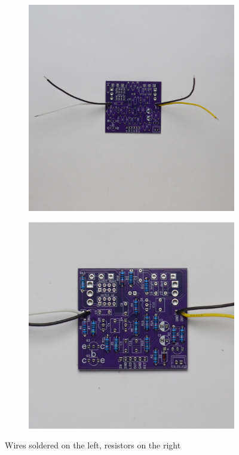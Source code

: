 \documentclass[a4paper,12pt]{article}
\begin{document}

\begin{figure}[h!]
  \centering
  \begin{subfigure}[b]{0.49\textwidth}
    \centering
    \includegraphics[width=\textwidth]{build/10-board-wires-1000px.jpg}
  \end{subfigure}
  \begin{subfigure}[b]{0.49\textwidth}
    \centering
    \includegraphics[width=\textwidth]{build/11-board-resistors-1000px.jpg}
  \end{subfigure}
  \caption{Wires soldered on the left, resistors on the right}
\end{figure}
\end{document}
